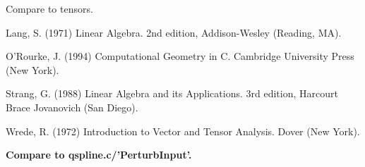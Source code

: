 \documentclass[10pt]{article}
\begin{document}
Compare to tensors.


\begin{thebibliography}{99}

Lang, S. (1971) Linear Algebra.
2nd edition, Addison-Wesley (Reading, MA).

O'Rourke, J. (1994)
Computational Geometry in C.
Cambridge University Press (New York).

Strang, G. (1988) Linear Algebra and its Applications.
3rd edition, Harcourt Brace Jovanovich (San Diego).

Wrede, R. (1972) Introduction to Vector and Tensor Analysis.
Dover (New York).

\end{thebibliography}

{\bf Compare to qspline.c/'PerturbInput'.}
\end{document}
